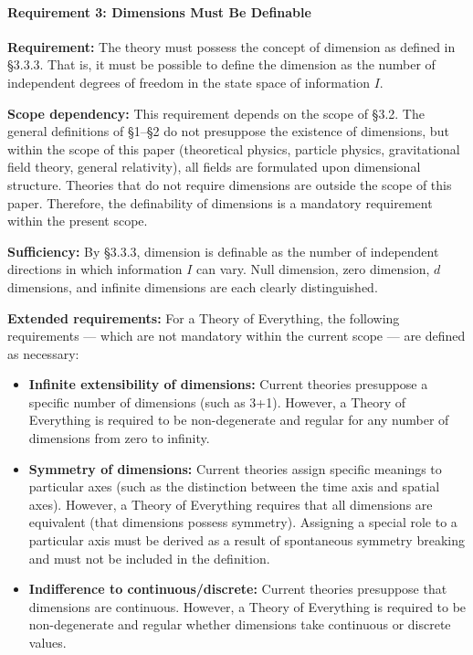 \documentclass[a4paper,11pt]{article}
\providecommand{\tightlist}{\setlength{\itemsep}{0pt}\setlength{\parskip}{0pt}}
\begin{document}
\paragraph{Requirement 3: Dimensions Must Be
Definable}\label{requirement-3-dimensions-must-be-definable}

\textbf{Requirement:} The theory must possess the concept of dimension
as defined in §3.3.3. That is, it must be possible to define the
dimension as the number of independent degrees of freedom in the state
space of information \(I\).

\textbf{Scope dependency:} This requirement depends on the scope of
§3.2. The general definitions of §1--§2 do not presuppose the existence
of dimensions, but within the scope of this paper (theoretical physics,
particle physics, gravitational field theory, general relativity), all
fields are formulated upon dimensional structure. Theories that do not
require dimensions are outside the scope of this paper. Therefore, the
definability of dimensions is a mandatory requirement within the present
scope.

\textbf{Sufficiency:} By §3.3.3, dimension is definable as the number of
independent directions in which information \(I\) can vary. Null
dimension, zero dimension, \(d\) dimensions, and infinite dimensions are
each clearly distinguished.

\textbf{Extended requirements:} For a Theory of Everything, the
following requirements --- which are not mandatory within the current
scope --- are defined as necessary:

\begin{itemize}
\tightlist
\item
  \textbf{Infinite extensibility of dimensions:} Current theories
  presuppose a specific number of dimensions (such as 3+1). However, a
  Theory of Everything is required to be non-degenerate and regular for
  any number of dimensions from zero to infinity.
\item
  \textbf{Symmetry of dimensions:} Current theories assign specific
  meanings to particular axes (such as the distinction between the time
  axis and spatial axes). However, a Theory of Everything requires that
  all dimensions are equivalent (that dimensions possess symmetry).
  Assigning a special role to a particular axis must be derived as a
  result of spontaneous symmetry breaking and must not be included in
  the definition.
\item
  \textbf{Indifference to continuous/discrete:} Current theories
  presuppose that dimensions are continuous. However, a Theory of
  Everything is required to be non-degenerate and regular whether
  dimensions take continuous or discrete values.
\end{itemize}
\end{document}
